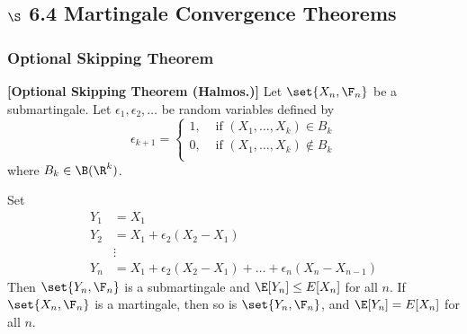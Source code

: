 \documentclass{article} %
\begin{document}
\subsection{ $\S$ 6.4 Martingale Convergence Theorems}

\subsubsection{Optional Skipping Theorem}

\begin{theorem}\textbf{[Optional Skipping Theorem (Halmos.)]}
Let $\set{X_n, \F_n}$ be a submartingale.  Let $\epsilon_1, \epsilon_2, \hdots$ be random variables defined by 
\[ \epsilon_{k+1} = 
\begin{cases} 
1, & \text{ if } (X_1, \hdots, X_k) \in B_k \\
0, & \text{ if } (X_1, \hdots, X_k) \not\in B_k \\ 	
\end{cases}
\]
where $B_k \in \B(\R^k)$.  

Set
%
\begin{align*}
	Y_1 &= X_1 \\
	Y_2 &= X_1 + \epsilon_2 (X_2 - X_1) \\
	&\vdots \\
	Y_n &= X_1 + \epsilon_2 (X_2 - X_1)  + \hdots + \epsilon_n (X_n - X_{n-1})
\end{align*}
%
Then $\set{Y_n, \F_n}$ is a submartingale and $\E[Y_n] \leq E[X_n]$ for all $n$.  If  $\set{X_n, \F_n}$ is a martingale, then so is   $\set{Y_n, \F_n}$, and $\E[Y_n] = E[X_n]$ for all $n$. 
\label{thm:optional_skipping}	
\end{theorem}
\end{document}
